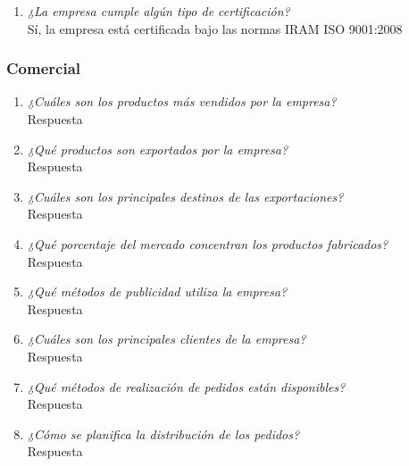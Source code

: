\documentclass[a4paper,10pt]{article}
\begin{document}
\begin{enumerate}
				\item \textit{¿La empresa cumple algún tipo de certificación?}\\
				Sí, la empresa está certificada bajo las normas IRAM ISO 9001:2008
						
			\end{enumerate}
			
			
		\subsubsection{Comercial}
		
		
			\begin{enumerate}[resume]
			
				\item \textit{¿Cuáles son los productos más vendidos por la empresa?}\\
			
				Respuesta
				
				\item \textit{¿Qué productos son exportados por la empresa?}\\
				
				Respuesta
				
				\item \textit{¿Cuáles son los principales destinos de las exportaciones?}\\
				
				Respuesta
				
				\item \textit{¿Qué porcentaje del mercado concentran los productos fabricados?}\\
				
				Respuesta
				
				\item \textit{¿Qué métodos de publicidad utiliza la empresa?}\\
				
				Respuesta
				
				\item \textit{¿Cuáles son los principales clientes de la empresa?}\\
				
				Respuesta
				
				\item \textit{¿Qué métodos de realización de pedidos están disponibles?}\\
				
				Respuesta
				
				\item \textit{¿Cómo se planifica la distribución de los pedidos?}\\
				
				Respuesta
				
			\end{enumerate}
			
\end{document}
